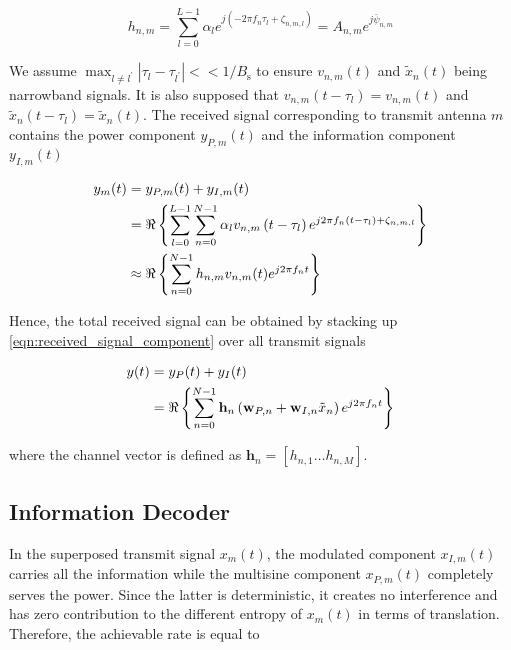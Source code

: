 \begin{equation}\label{eqn:channel}
  {h_{n,m}} = \sum\limits_{l = 0}^{L - 1} {{\alpha _l}{e^{j\left( { - 2\pi {f_n}{\tau _l} + {\zeta _{n,m,l}}} \right)}}}  = {A_{n,m}}{e^{j{{\bar \psi }_{n,m}}}}
\end{equation}

We assume ${\max _{l \ne {l^\prime }}}\left| {{\tau _l} - {\tau _{{l^\prime }}}} \right| <  < 1/{B_{\text{s}}}$ to ensure $v_{n, m}(t)$ and $\tilde{x}_{n}(t)$ being narrowband signals. It is also supposed that ${v_{n,m}}\left( {t - {\tau _l}} \right) = {v_{n,m}}(t)$ and ${{\tilde x}_n}\left( {t - {\tau _l}} \right) = {{\tilde x}_n}(t)$. The received signal corresponding to transmit antenna $m$ contains the power component $y_{P, m}(t)$ and the information component $y_{I, m}(t)$

\begin{align}\label{eqn:received_signal_component}
  {y_m}(t) &= {y_{P,m}}(t) + {y_{I,m}}(t) \hfill \\
   &= \Re \left\{ {\sum\limits_{l = 0}^{L - 1} {\sum\limits_{n = 0}^{N - 1} {{\alpha _l}} } {v_{n,m}}\left( {t - {\tau _l}} \right){e^{j2\pi {f_n}\left( {t - {\tau _l}} \right) + {\zeta _{n,m,l}}}}} \right\} \hfill \\
   &\approx \Re \left\{ {\sum\limits_{n = 0}^{N - 1} {{h_{n,m}}} {v_{n,m}}(t){e^{j2\pi {f_n}t}}} \right\} \hfill
\end{align}

Hence, the total received signal can be obtained by stacking up \eqref{eqn:received_signal_component} over all transmit signals

\begin{align}\label{eqn:received_signal}
  y(t) &= {y_P}(t) + {y_I}(t) \hfill \\
   &= \Re \left\{ {\sum\limits_{n = 0}^{N - 1} {{{\mathbf{h}}_n}} \left( {{{\mathbf{w}}_{P,n}} + {{\mathbf{w}}_{I,n}}{{\tilde x}_n}} \right){e^{j2\pi {f_n}t}}} \right\} \hfill
\end{align}

where the channel vector is defined as ${{\mathbf{h}}_n} = \left[ {{h_{n,1}} \ldots {h_{n,M}}} \right]$.



\subsection{Information Decoder}\label{sec:information-decoder}
In the superposed transmit signal ${x_m}(t)$, the modulated component ${x_{I,m}}(t)$ carries all the information while the multisine component ${x_{P,m}}(t)$ completely serves the power. Since the latter is deterministic, it creates no interference and has zero contribution to the different entropy of ${x_m}(t)$ in terms of translation. Therefore, the achievable rate is equal to

